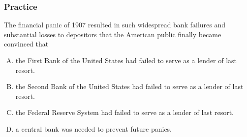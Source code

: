 \documentclass{beamer}
\begin{document}
\begin{practiceframe}
\frametitle{Practice}
    The financial panic of 1907 resulted in such widespread bank failures and substantial losses to depositors that the American public finally became convinced that
    \begin{enumerate}[A. ]
        \item the First Bank of the United States had failed to serve as a lender of last resort.
        \item the Second Bank of the United States had failed to serve as a lender of last resort.
        \item the Federal Reserve System had failed to serve as a lender of last resort.
        \item a central bank was needed to prevent future panics.
    \end{enumerate}


\end{practiceframe}
\end{document}
